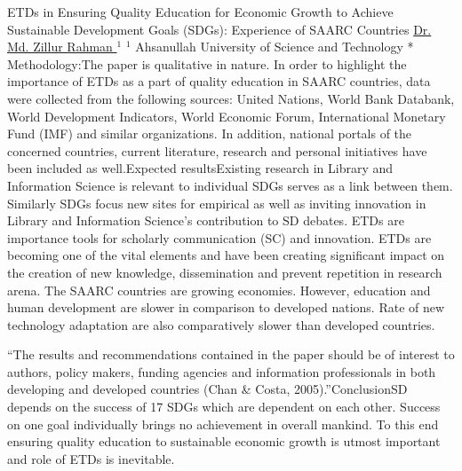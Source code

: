\begin{abstract_online}{ ETDs in Ensuring Quality Education for Economic Growth to Achieve Sustainable Development Goals (SDGs):  Experience of SAARC Countries}{%
        \underline{ Dr. Md. Zillur Rahman }$^{1}$}{%
        }{%
        $^1$  Ahsanullah University of Science and Technology *\newline{}
            }
	Methodology:The paper is qualitative in nature. In order to highlight the importance of ETDs as a part of quality education in SAARC countries, data were collected from the following sources: United Nations, World Bank Databank, World Development Indicators, World Economic Forum, International Monetary Fund (IMF) and similar organizations. In addition, national portals of the concerned countries, current literature, research and personal initiatives have been included as well.Expected resultsExisting research in Library and Information Science is relevant to individual SDGs serves as a link between them. Similarly SDGs focus new sites for empirical as well as inviting innovation in Library and Information Science’s contribution to SD debates. ETDs are importance tools for scholarly communication (SC) and innovation. ETDs are becoming one of the vital elements and have been creating significant impact on the creation of new knowledge, dissemination and prevent repetition in research arena. The SAARC countries are growing economies. However, education and human development are slower in comparison to developed nations. Rate of new technology adaptation are also comparatively slower than developed countries. 
	
	“The results and recommendations contained in the paper should be of interest to authors, policy makers, funding agencies and information professionals in both developing and developed countries (Chan & Costa, 2005).”ConclusionSD depends on the success of 17 SDGs which are dependent on each other. Success on one goal individually brings no achievement in overall mankind. To this end ensuring quality education to sustainable economic growth is utmost important and role of ETDs is inevitable. 
    \end{abstract_online}
    
